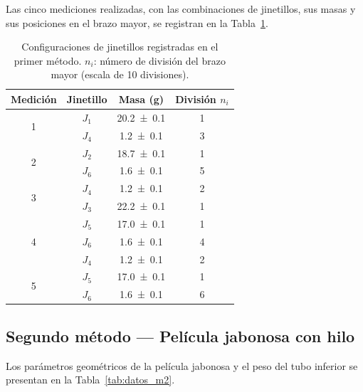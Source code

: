 Las cinco mediciones realizadas, con las combinaciones de jinetillos,
sus masas y sus posiciones en el brazo mayor, se registran en la
Tabla~\ref{tab:datos_m1}.

\begin{table}[H]
    \centering
    \caption{Configuraciones de jinetillos registradas en el primer
             método. $n_i$: número de división del brazo mayor
             (escala de 10 divisiones).}
    \label{tab:datos_m1}
    \begin{tabular}{cccc}
        \toprule
        \textbf{Medición} & \textbf{Jinetillo} & \textbf{Masa (g)} &
        \textbf{División $n_i$} \\
        \midrule
        \multirow{2}{*}{1} & $J_1$ & \num{20.2 \pm 0.1} & 1 \\
                           & $J_4$ & \num{1.2 \pm 0.1}  & 3 \\
        \midrule
        \multirow{2}{*}{2} & $J_2$ & \num{18.7 \pm 0.1} & 1 \\
                           & $J_6$ & \num{1.6 \pm 0.1}  & 5 \\
        \midrule
        \multirow{2}{*}{3} & $J_4$ & \num{1.2 \pm 0.1}  & 2 \\
                           & $J_3$ & \num{22.2 \pm 0.1} & 1 \\
        \midrule
        \multirow{3}{*}{4} & $J_5$ & \num{17.0 \pm 0.1} & 1 \\
                           & $J_6$ & \num{1.6 \pm 0.1}  & 4 \\
                           & $J_4$ & \num{1.2 \pm 0.1}  & 2 \\
        \midrule
        \multirow{2}{*}{5} & $J_5$ & \num{17.0 \pm 0.1} & 1 \\
                           & $J_6$ & \num{1.6 \pm 0.1}  & 6 \\
        \bottomrule
    \end{tabular}
\end{table}

\subsection{Segundo método --- Película jabonosa con hilo}

Los parámetros geométricos de la película jabonosa y el peso del tubo
inferior se presentan en la Tabla~\ref{tab:datos_m2}.

